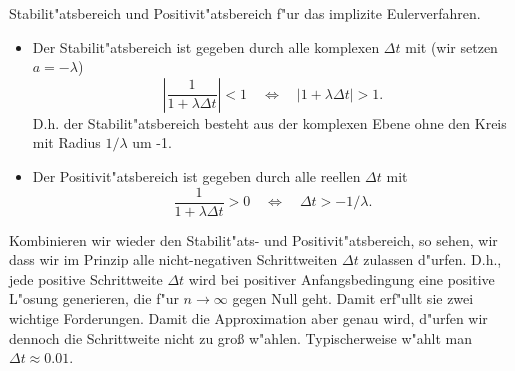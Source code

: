 \begin{bspX} Stabilit"atsbereich und Positivit"atsbereich f"ur das implizite Eulerverfahren.\par
\begin{itemize}
\item Der Stabilit"atsbereich ist gegeben durch 
alle komplexen $\Delta t$ mit (wir setzen $a=-\lambda$)
$$ 
\left |\frac 1 {1+\lambda \Delta t}\right| <1
\quad \Leftrightarrow\quad
\left |1+\lambda \Delta t\right| >1.
$$
D.h. der Stabilit"atsbereich besteht aus der komplexen Ebene {\rm ohne} den Kreis 
mit Radius $1/\lambda$ um -1.
\item Der Positivit"atsbereich ist gegeben durch alle reellen $\Delta t$ mit
$$ \frac 1 {1+\lambda \Delta t}>0
\quad \Leftrightarrow\quad
\Delta t > -1/\lambda.
$$
\end{itemize}
\end{bspX}
Kombinieren wir wieder den Stabilit"ats- und Positivit"atsbereich, so sehen, wir 
dass wir im Prinzip alle nicht-negativen Schrittweiten $\Delta t$ zulassen d"urfen. 
D.h., jede positive Schrittweite $\Delta t$ wird bei positiver Anfangsbedingung 
eine positive L"osung generieren, die f"ur $n\rightarrow\infty$ gegen Null geht. 
Damit erf"ullt sie zwei wichtige Forderungen. Damit die Approximation aber genau wird, d"urfen wir dennoch die Schrittweite nicht zu gro\ss{} w"ahlen. Typischerweise w"ahlt man $\Delta t \approx 0.01$. 
